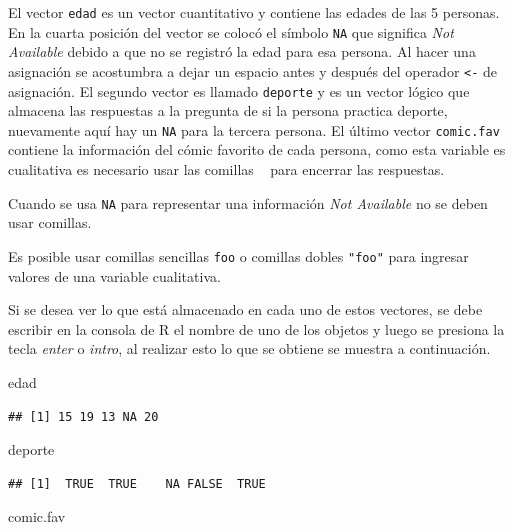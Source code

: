 \documentclass[10pt,]{krantz}
\makeatletter
\newenvironment{Shaded}{\begin{snugshade}}{\end{snugshade}}
\newcommand{\NormalTok}[1]{#1}
\let\proglang=\textsf
\newenvironment{kframe}{%
\medskip{}
\setlength{\fboxsep}{.8em}
 \def\at@end@of@kframe{}%
 \ifinner\ifhmode%
  \def\at@end@of@kframe{\end{minipage}}%
  \begin{minipage}{\columnwidth}%
 \fi\fi%
 \def\FrameCommand##1{\hskip\@totalleftmargin \hskip-\fboxsep
 \colorbox{shadecolor}{##1}\hskip-\fboxsep
     \hskip-\linewidth \hskip-\@totalleftmargin \hskip\columnwidth}%
 \MakeFramed {\advance\hsize-\width
   \@totalleftmargin\z@ \linewidth\hsize
   \@setminipage}}%
 {\par\unskip\endMakeFramed%
 \at@end@of@kframe}
\renewenvironment{Shaded}{\begin{kframe}}{\end{kframe}}
\let\BeginKnitrBlock\begin \let\EndKnitrBlock\end
\makeatother
\begin{document}
El vector \texttt{edad} es un vector cuantitativo y contiene las edades
de las 5 personas. En la cuarta posición del vector se colocó el símbolo
\texttt{NA} que significa \textit{Not Available} debido a que no se
registró la edad para esa persona. Al hacer una asignación se acostumbra
a dejar un espacio antes y después del operador \texttt{\textless{}-} de
asignación. El segundo vector es llamado \texttt{deporte} y es un vector
lógico que almacena las respuestas a la pregunta de si la persona
practica deporte, nuevamente aquí hay un \texttt{NA} para la tercera
persona. El último vector \texttt{comic.fav} contiene la información del
cómic favorito de cada persona, como esta variable es cualitativa es
necesario usar las comillas
\texttt{\textquotesingle{}\ \textquotesingle{}} para encerrar las
respuestas.

\BeginKnitrBlock{rmdwarning}
Cuando se usa \texttt{NA} para representar una información
\textit{Not Available} no se deben usar comillas.
\EndKnitrBlock{rmdwarning}

\BeginKnitrBlock{rmdnote}
Es posible usar comillas sencillas
\texttt{\textquotesingle{}foo\textquotesingle{}} o comillas dobles
\texttt{"foo"} para ingresar valores de una variable cualitativa.
\EndKnitrBlock{rmdnote}

Si se desea ver lo que está almacenado en cada uno de estos vectores, se
debe escribir en la consola de \proglang{R} el nombre de uno de los
objetos y luego se presiona la tecla \textit{enter} o \textit{intro}, al
realizar esto lo que se obtiene se muestra a continuación.

\begin{Shaded}
\begin{Highlighting}[]
\NormalTok{edad}
\end{Highlighting}
\end{Shaded}

\begin{verbatim}
## [1] 15 19 13 NA 20
\end{verbatim}

\begin{Shaded}
\begin{Highlighting}[]
\NormalTok{deporte}
\end{Highlighting}
\end{Shaded}

\begin{verbatim}
## [1]  TRUE  TRUE    NA FALSE  TRUE
\end{verbatim}

\begin{Shaded}
\begin{Highlighting}[]
\NormalTok{comic.fav}
\end{Highlighting}
\end{Shaded}
\end{document}
